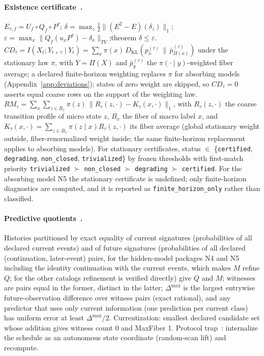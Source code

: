 \paragraph{Existence certificate~\cite{sbt-f1,sbt-f3,sbt-xor,sbt-ng,sbt-cast}.}
$E_{\tau,f} = U_f \circ Q_f \circ P^\tau$;\quad
$\delta = \max_z \tfrac12 \|(E^2 - E)(\delta_z)\|_1$;\quad
$\varepsilon = \max_x \|Q_f(u_x P^{\tau}) - \delta_x\|_{TV}$;\quad theorem $\delta \le \varepsilon$.
$CD_\tau = I(X_t; Y_{t+\tau} \mid Y_t) = \sum_x \pi(x)\, D_{\mathrm{KL}}(p_x^{(\tau)} \,\|\, \bar p_{\Pi(x)}^{(\tau)})$ under the stationary law $\pi$, with $Y = \Pi(X)$ and $\bar p_y^{(\tau)}$ the $\pi(\cdot \mid y)$-weighted fiber average; a declared finite-horizon weighting replaces $\pi$ for absorbing models (Appendix~\ref{app:deviations}); states of zero weight are skipped, so $CD_\tau = 0$ asserts equal coarse rows on the support of the weighting law.
$RM_\tau = \sum_x \sum_{z \in B_x} \pi(z)\, \|R_\tau(z,\cdot) - K_\tau(x,\cdot)\|_1$, with $R_\tau(z,\cdot)$ the coarse transition profile of micro state $z$, $B_x$ the fiber of macro label $x$, and $K_\tau(x,\cdot) = \sum_{z \in B_x} \pi(z \mid x) R_\tau(z,\cdot)$ its fiber average (global stationary weight outside, fiber-renormalized weight inside; the same finite-horizon replacement applies to absorbing models). For stationary certificates, status $\in$ \{\texttt{certified}, \texttt{degrading}, \texttt{non\_closed}, \texttt{trivialized}\} by frozen thresholds with first-match priority \texttt{trivialized} $\succ$ \texttt{non\_closed} $\succ$ \texttt{degrading} $\succ$ \texttt{certified}. For the absorbing model N5 the stationary certificate is undefined; only finite-horizon diagnostics are computed, and it is reported as \texttt{finite\_horizon\_only} rather than classified.

\paragraph{Predictive quotients~\cite{sbt-hol}.} Histories partitioned by exact equality of current signatures (probabilities of all declared current events) and of future signatures (probabilities of all declared (continuation, later-event) pairs, for the hidden-model packages N4 and N5 including the identity continuation with the current events, which makes $M$ refine $Q$; for the other catalogs refinement is verified directly) give $Q$ and $M$; witnesses are pairs equal in the former, distinct in the latter; $\Delta^{\max}$ is the largest entrywise future-observation difference over witness pairs (exact rational), and any predictor that uses only current information (one prediction per current class) has uniform error at least $\Delta^{\max}/2$. Currentization: smallest declared candidate set whose addition gives witness count 0 and MaxFiber 1. Protocol trap~\cite{sbt-pt}: internalize the schedule as an autonomous state coordinate (random-scan lift) and recompute.

